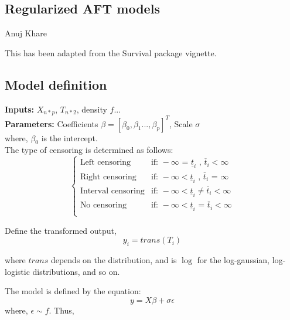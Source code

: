 \documentclass[12pt,a4paper]{report}
\begin{document}
\begin{center} \section*{Regularized AFT models} Anuj Khare \end{center}
This has been adapted from the Survival package vignette.

\subsection*{Model definition}
\textbf{Inputs:} $X_{n * p}$, $T_{n * 2}$, density $f$... \\
\textbf{Parameters:} Coefficients $\beta = [\beta_0, \beta_1 ... , \beta_p]^T$, Scale $\sigma $ \\

where, $\beta_0$ is the intercept.  \\

\vspace{4mm}
The type of censoring is determined as follows:
\begin{equation} \label{zeta}
 \begin{cases}
    \mbox{Left censoring} & \mbox{if: } -\infty \textbf{ = } \underline t_i \mbox{ , } \overline t_i<\infty \\
    \mbox{Right censoring} & \mbox{if: } -\infty < \underline t_i \mbox{ , }\overline t_i\textbf{ = }\infty \\
    \mbox{Interval censoring} &  \mbox{if: } -\infty < \underline t_i \ne \overline t_i<\infty \\
    \mbox{No censoring} & \mbox{if: } -\infty < \underline t_i \textbf{ = } \overline t_i<\infty \\
	\end{cases}
\end{equation}

\vspace{4mm}
Define the transformed output,
\begin{equation}
	y_i = trans (T_i)
\end{equation}

where $trans$ depends on the distribution, and is $\log$ for the log-gaussian, log-logistic distributions, and so on.

\vspace{4mm}
The model is defined by the equation:
\begin{equation}
	y = X \beta + \sigma \epsilon
\end{equation}
where, $\epsilon \sim f$. Thus,
\end{document}
